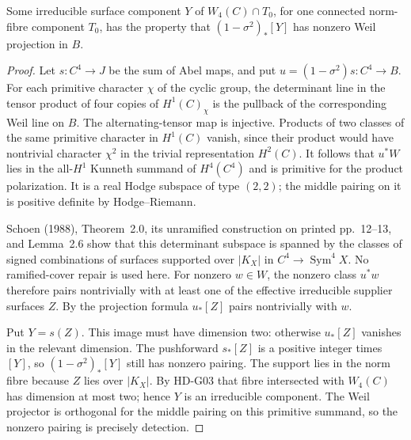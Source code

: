 \begin{lemma}
\label{HD-G04a}
Some irreducible surface component $Y$ of
$W_4(C)\cap T_0$, for one connected norm-fibre component $T_0$,
has the property that $(1-\sigma^2)_*[Y]$ has nonzero Weil projection
in $B$.
\end{lemma}
\begin{proof}
Let $s:C^4\to J$ be the sum of Abel maps, and put
$u=(1-\sigma^2)s:C^4\to B$.
For each primitive character $\chi$ of the cyclic group, the
determinant line in the tensor product of four copies of
$H^1(C)_\chi$ is the pullback of the corresponding Weil line on $B$.
The alternating-tensor map is injective. Products of two classes of
the same primitive character in $H^1(C)$ vanish, since their product
would have nontrivial character $\chi^2$ in the trivial representation
$H^2(C)$. It follows that $u^*W$ lies in the all-$H^1$ Kunneth
summand of $H^4(C^4)$ and is primitive for the product polarization.
It is a real Hodge subspace of type $(2,2)$; the middle pairing on it
is positive definite by Hodge--Riemann.

Schoen (1988), Theorem~2.0, its unramified construction on printed
pp.~12--13, and Lemma~2.6 show that this determinant subspace is
spanned by the classes of signed combinations of surfaces supported
over $|K_X|$ in $C^4\to\operatorname{Sym}^4 X$. No ramified-cover
repair is used here. For nonzero $w\in W$, the nonzero class $u^*w$
therefore pairs nontrivially with at least one of the effective
irreducible supplier surfaces $Z$. By the projection formula
$u_*[Z]$ pairs nontrivially with $w$.

Put $Y=s(Z)$. This image must have dimension two: otherwise $u_*[Z]$
vanishes in the relevant dimension. The pushforward $s_*[Z]$ is a
positive integer times $[Y]$, so $(1-\sigma^2)_*[Y]$ still has
nonzero pairing. The support lies in the norm fibre because
$Z$ lies over $|K_X|$. By HD-G03 that fibre intersected with $W_4(C)$
has dimension at most two; hence $Y$ is an irreducible component.
The Weil projector is orthogonal for the middle pairing on this
primitive summand, so the nonzero pairing is precisely detection.
\end{proof}

